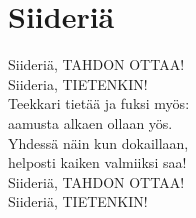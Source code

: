 \section{Siideriä}
Siideriä, TAHDON OTTAA!\\
Siideria, TIETENKIN!\\
Teekkari tietää ja fuksi myös:\\
aamusta alkaen ollaan yös.\\
Yhdessä näin kun dokaillaan,\\
helposti kaiken valmiiksi saa!\\
Siideriä, TAHDON OTTAA!\\
Siideriä, TIETENKIN!